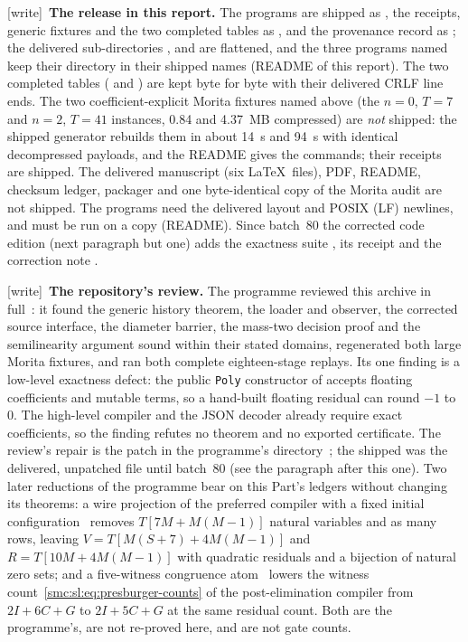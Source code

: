 \documentclass[11pt,letterpaper]{article}
\numberwithin{equation}{section}
\theoremstyle{definition}
\theoremstyle{remark}
\newcommand{\wtag}{\textup{[write]}}
\begin{document}
\wtag\ \textbf{The release in this report.} The programs are shipped as , the receipts, generic fixtures and the two completed tables as , and the provenance record as ; the delivered sub-directories ,  and  are flattened, and the three programs named  keep their directory in their shipped names (README of this report). The two completed tables ( and ) are kept byte for byte with their delivered CRLF line ends. The two coefficient-explicit Morita fixtures named above (the $n=0$, $T=7$ and $n=2$, $T=41$ instances, 0.84 and 4.37~MB compressed) are \emph{not} shipped: the shipped generator rebuilds them in about 14~s and 94~s with identical decompressed payloads, and the README gives the commands; their receipts are shipped. The delivered manuscript (six \LaTeX\ files), PDF, README, checksum ledger, packager and one byte-identical copy of the Morita audit are not shipped. The programs need the delivered layout and POSIX (LF) newlines, and must be run on a copy (README). Since batch~80 the corrected code edition (next paragraph but one) adds the exactness suite , its receipt  and the correction note .

\wtag\ \textbf{The repository's review.} The programme reviewed this archive in full~\cite{reviewsl}: it found the generic history theorem, the loader and observer, the corrected source interface, the diameter barrier, the mass-two decision proof and the semilinearity argument sound within their stated domains, regenerated both large Morita fixtures, and ran both complete eighteen-stage replays. Its one finding is a low-level exactness defect: the public \texttt{Poly} constructor of  accepts floating coefficients and mutable terms, so a hand-built floating residual can round $-1$ to $0$. The high-level compiler and the JSON decoder already require exact coefficients, so the finding refutes no theorem and no exported certificate. The review's repair is the patch  in the programme's directory~\cite{reviewsl}; the shipped  was the delivered, unpatched file until batch~80 (see the paragraph after this one). Two later reductions of the programme bear on this Part's ledgers without changing its theorems: a wire projection of the preferred compiler with a fixed initial configuration~\cite{reviewslproj} removes $T[7M+M(M-1)]$ natural variables and as many rows, leaving $V=T[M(S+7)+4M(M-1)]$ and $R=T[10M+4M(M-1)]$ with quadratic residuals and a bijection of natural zero sets; and a five-witness congruence atom~\cite{reviewcong} lowers the witness count~\eqref{smc:sl:eq:presburger-counts} of the post-elimination compiler from $2I+6C+G$ to $2I+5C+G$ at the same residual count. Both are the programme's, are not re-proved here, and are not gate counts.
\end{document}
